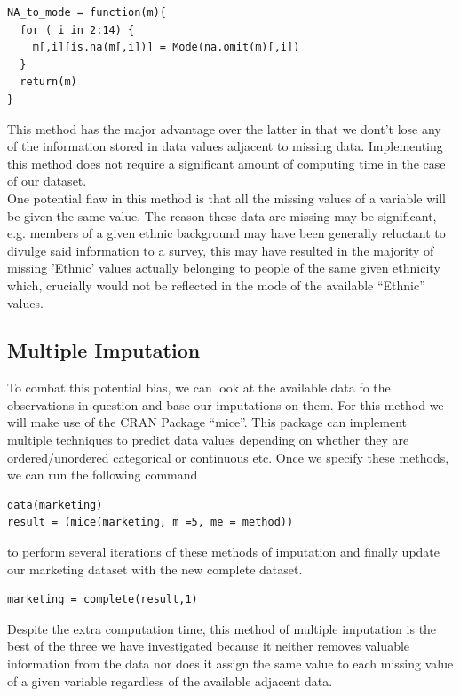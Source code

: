 \documentclass[11pt]{article}
\begin{document}
\begin{verbatim}
NA_to_mode = function(m){
  for ( i in 2:14) {
    m[,i][is.na(m[,i])] = Mode(na.omit(m)[,i])
  }
  return(m)
}
\end{verbatim}

This method has the major advantage over the latter in that we dont't lose any of the information stored in data values adjacent to missing data. Implementing this method does not require a significant amount of computing time in the case of our dataset.
\\

 One potential flaw in this method is that all the missing values of a variable will be given the same value. The reason these data are missing may be significant, e.g. members of a given ethnic background may have been generally reluctant to divulge said information to a survey, this may have resulted in the majority of missing 'Ethnic' values actually belonging to people of the same given ethnicity which, crucially would not be reflected in the mode of the available “Ethnic” values.
\\

\subsection{Multiple Imputation}
To combat this potential bias, we can look at the available data fo the observations in question and base our imputations on them. For this method we will make use of the CRAN Package “mice”. This package can implement multiple techniques to predict data values depending on whether they are ordered/unordered categorical or continuous etc. Once we specify these methods, we can run the  following command

\begin{verbatim}
data(marketing)
result = (mice(marketing, m =5, me = method))
\end{verbatim}

to perform several iterations of these methods of imputation and finally update our marketing dataset with the new complete dataset.

\begin{verbatim}
marketing = complete(result,1)
\end{verbatim}

Despite the extra computation time, this method of multiple imputation is the best of the three we have investigated because it neither removes valuable information from the data nor does it assign the same value to each missing value of a given variable regardless of the available adjacent data.
\\
\end{document}
